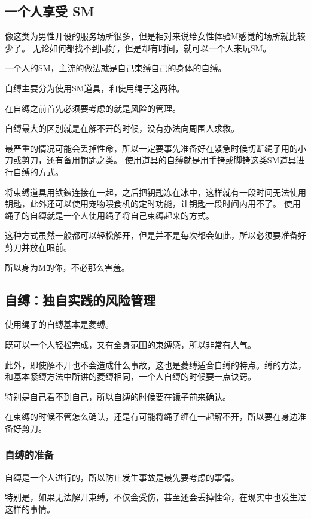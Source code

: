 \documentclass[12pt,UTF8]{ctexbook}
\begin{document}
\subsection{一个人享受 SM}

像这类为男性开设的服务场所很多，但是相对来说给女性体验M感觉的场所就比较少了。 无论如何都找不到同好，但是却有时间，就可以一个人来玩SM。

一个人的SM，主流的做法就是自己束缚自己的身体的自缚。

自缚主要分为使用SM道具，和使用绳子这两种。

在自缚之前首先必须要考虑的就是风险的管理。

自缚最大的区别就是在解不开的时候，没有办法向周围人求救。

最严重的情况可能会丢掉性命，所以一定要事先准备好在紧急时候切断绳子用的小刀或剪刀，还有备用钥匙之类。 使用道具的自缚就是用手铐或脚铐这类SM道具进行自缚的方式。

将束缚道具用铁鍊连接在一起，之后把钥匙冻在冰中，这样就有一段时间无法使用钥匙，此外还可以使用宠物喂食机的定时功能，让钥匙一段时间内用不了。 使用绳子的自缚就是一个人使用绳子将自己束缚起来的方式。

这种方式虽然一般都可以轻松解开，但是并不是每次都会如此，所以必须要准备好剪刀并放在眼前。

所以身为M的你，不必那么害羞。

\subsection{自缚：独自实践的风险管理}

使用绳子的自缚基本是菱缚。

既可以一个人轻松完成，又有全身范围的束缚感，所以非常有人气。

此外，即使解不开也不会造成什么事故，这也是菱缚适合自缚的特点。缚的方法，和基本紧缚方法中所讲的菱缚相同，一个人自缚的时候要一点诀窍。

特别是自己看不到自己，所以自缚的时候要在镜子前来确认。

在束缚的时候不管怎么确认，还是有可能将绳子缠在一起解不开，所以要在身边准备好剪刀。

\subsubsection{自缚的准备}

自缚是一个人进行的，所以防止发生事故是最先要考虑的事情。

特别是，如果无法解开束缚，不仅会受伤，甚至还会丢掉性命，在现实中也发生过这样的事情。
\end{document}
